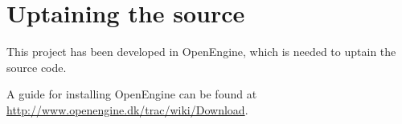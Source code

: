 \chapter{Uptaining the source}

This project has been developed in OpenEngine, which is needed to
uptain the source code.

A guide for installing OpenEngine can be found at
\url{http://www.openengine.dk/trac/wiki/Download}.


